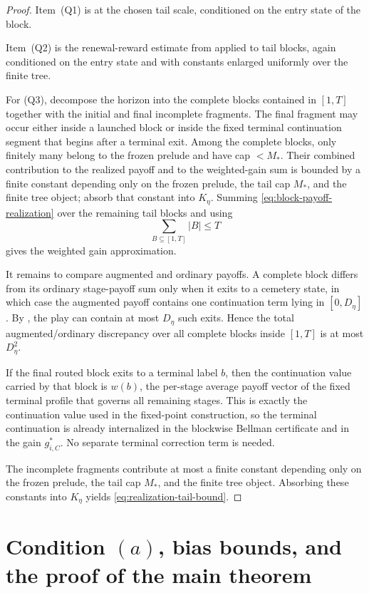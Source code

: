 \documentclass[12pt]{article}
\theoremstyle{definition}
\newcommand{\1}{\mathbf{1}}
\begin{document}
\begin{proof}
Item~(Q1) is  at the chosen tail scale, conditioned on
the entry state of the block.

Item~(Q2) is the renewal-reward estimate from 
applied to tail blocks, again conditioned on the entry state and with constants
enlarged uniformly over the finite tree.

For (Q3), decompose the horizon into the complete blocks contained in $[1,T]$
together with the initial and final incomplete fragments. The final fragment may
occur either inside a launched block or inside the fixed terminal continuation
segment that begins after a terminal exit. Among the complete blocks, only
finitely many belong to the frozen prelude and have cap $<M_*$. Their combined
contribution to the realized payoff and to the weighted-gain sum is bounded by
a finite constant depending only on the frozen prelude, the tail cap $M_*$, and
the finite tree object; absorb that constant into $K_\eta$. Summing
\eqref{eq:block-payoff-realization} over the remaining tail blocks and using
\[
\sum_{B\subseteq [1,T]} |B|\le T
\]
gives the weighted gain approximation.

It remains to compare augmented and ordinary payoffs. A complete block differs
from its ordinary stage-payoff sum only when it exits to a cemetery state, in
which case the augmented payoff contains one continuation term lying in
$[0,D_\eta]$. By , the play can contain at most $D_\eta$
such exits. Hence the total augmented/ordinary discrepancy over all complete
blocks inside $[1,T]$ is at most $D_\eta^2$.

If the final routed block exits to a terminal label $b$, then the continuation
value carried by that block is $w(b)$, the per-stage average payoff vector of
the fixed terminal profile that governs all remaining stages. This is exactly
the continuation value used in the fixed-point construction, so the terminal
continuation is already internalized in the blockwise Bellman certificate and in
the gain $g_{i,C}^*$. No separate terminal correction term is needed.

The incomplete fragments contribute at most a finite constant depending only on
the frozen prelude, the tail cap $M_*$, and the finite tree object. Absorbing
these constants into $K_\eta$ yields \eqref{eq:realization-tail-bound}.
\end{proof}

\section{Condition \texorpdfstring{$(a)$}{(a)}, bias bounds, and the proof of the main theorem}
\label{sec:proof-main}
\end{document}
